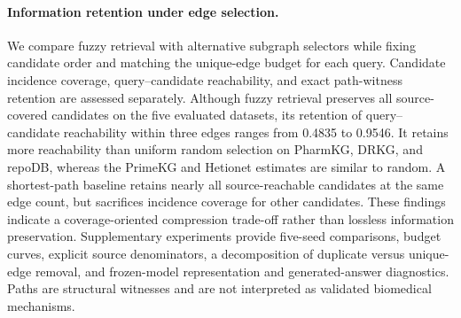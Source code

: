 \paragraph{Information retention under edge selection.}
We compare fuzzy retrieval with alternative subgraph selectors while fixing
candidate order and matching the unique-edge budget for each query. Candidate
incidence coverage, query--candidate reachability, and exact path-witness
retention are assessed separately. Although fuzzy retrieval preserves all
source-covered candidates on the five evaluated datasets, its retention of
query--candidate reachability within three edges ranges from 0.4835 to 0.9546.
It retains more reachability than uniform random selection on PharmKG, DRKG,
and repoDB, whereas the PrimeKG and Hetionet estimates are similar to random.
A shortest-path baseline retains nearly all source-reachable candidates at
the same edge count, but sacrifices incidence coverage for other candidates.
These findings indicate a coverage-oriented compression trade-off rather than
lossless information preservation. Supplementary experiments provide
five-seed comparisons, budget curves, explicit source denominators, a
decomposition of duplicate versus unique-edge removal, and frozen-model
representation and generated-answer diagnostics. Paths are structural
witnesses and are not interpreted as validated biomedical mechanisms.

